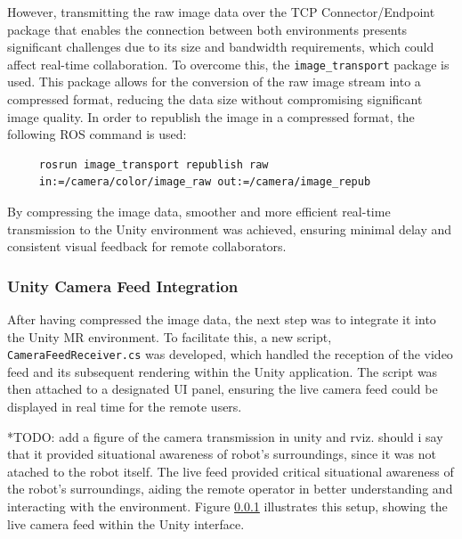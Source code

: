 However, transmitting the raw image data over the \ac{TCP} Connector/Endpoint package that enables the connection between both environments presents significant challenges due to its size and bandwidth requirements, which could affect real-time collaboration.
To overcome this, the \texttt{image\_transport} package is used. This package allows for the conversion of the raw image stream into a compressed format, reducing the data size without compromising significant image quality. In order to republish the image in a compressed format, the following \ac{ROS} command is used:

\begin{verbatim}
     rosrun image_transport republish raw 
     in:=/camera/color/image_raw out:=/camera/image_repub 
\end{verbatim}

By compressing the image data, smoother and more efficient real-time transmission to the Unity environment was achieved, ensuring minimal delay and consistent visual feedback for remote collaborators.

\subsubsection{Unity Camera Feed Integration}

After having compressed the image data, the next step was to integrate it into the Unity \ac{MR} environment. To facilitate this, a new script, \texttt{CameraFeedReceiver.cs} was developed, which handled the reception of the video feed and its subsequent rendering within the Unity application. The script was then attached to a designated \ac{UI} panel, ensuring the live camera feed could be displayed in real time for the remote users. 

*TODO: add a figure of the camera transmission in unity and rviz. should i say that it provided situational awareness of robot's surroundings, since it was not atached to the robot itself. 
The live feed provided critical situational awareness of the robot’s surroundings, aiding the remote operator in better understanding and interacting with the environment. Figure \ref{} illustrates this setup, showing the live camera feed within the Unity interface.





